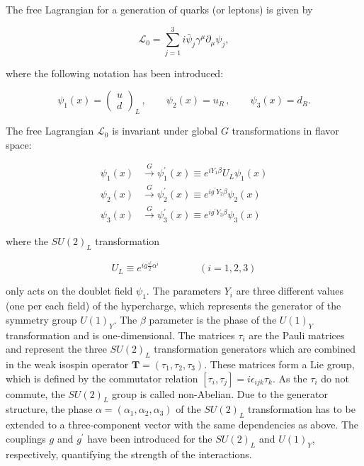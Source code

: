 The free Lagrangian for a generation of quarks (or leptons) is given by

\begin{equation}\label{eqn:SM_e12}
\mathcal{L}_0 = \sum_{j=1}^3 i\bar{\psi}_j\gamma^\mu\partial_\mu\psi_j,
\end{equation}

\noindent where the following notation has been introduced:

\begin{equation}\label{eqn:SM_e13}
\psi_1(x) = 
\begin{pmatrix}
  u \\ d
\end{pmatrix}_L
\,
,
\qquad
\psi_2(x) = u_R \, , \qquad \psi_3(x) = d_R.
\end{equation}

The free Lagrangian $\mathcal{L}_0$ is invariant under global $G$ transformations in flavor space:

\begin{equation}\label{eqn:SM_e14}
\begin{split}
\psi_1(x) & \xrightarrow{G} \psi_1^\prime(x) \equiv e^{iY_1\beta}U_L\psi_1(x) \\ 
\psi_2(x) & \xrightarrow{G} \psi_2^\prime(x) \equiv e^{ig^\prime Y_2\beta}\psi_2(x) \\
\psi_3(x) & \xrightarrow{G} \psi_3^\prime(x) \equiv e^{ig^\prime Y_3\beta}\psi_3(x)
\end{split}
\end{equation}

\noindent where the $SU(2)_L$ transformation

\begin{equation}\label{eqn:SM_e15}
U_L \equiv e^{ig\frac{\tau^i}{2}\alpha^i} \qquad\qquad (i = 1,2,3)
\end{equation}

\noindent only acts on the doublet field $\psi_1$.
The parameters $Y_i$ are three different values (one per each field) of the hypercharge, which represents the generator of the symmetry group $U(1)_Y$.
The $\beta$ parameter is the phase of the $U(1)_Y$ transformation and is one-dimensional.
The matrices $\tau_i$ are the Pauli matrices and represent the three $SU(2)_L$ transformation generators which are combined in the weak isospin operator
$\textbf{T} = (\tau_1, \tau_2, \tau_3)$. These matrices form a Lie group, which is defined by the commutator relation $[\tau_i,\tau_j] = i\epsilon_{ijk}\tau_k$.
As the $\tau_i$ do not commute, the $SU(2)_L$ group is called non-Abelian.
Due to the generator structure, the phase $\alpha = (\alpha_1, \alpha_2, \alpha_3)$ of the $SU(2)_L$ transformation has to be extended to a three-component vector with the same dependencies as above.
The couplings $g$ and $g^\prime$ have been introduced for the $SU(2)_L$ and $U(1)_Y$, respectively, quantifying the strength of the interactions.

